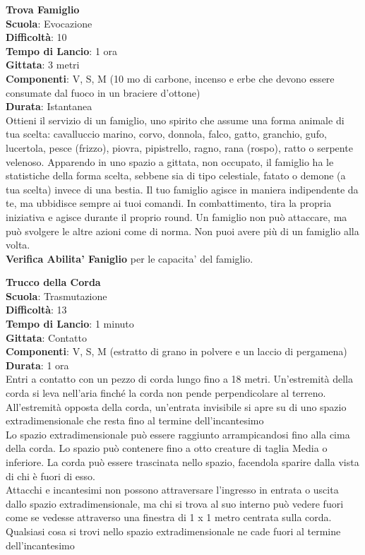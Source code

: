 \begin{multicols}{2}
\medskip\textbf{Trova Famiglio}\\
\textbf{Scuola}: Evocazione\\
\textbf{Difficoltà}:  10\\
\textbf{Tempo di Lancio}: 1 ora\\
\textbf{Gittata}: 3 metri\\
\textbf{Componenti}: V, S, M (10 mo di carbone, incenso e erbe che devono essere consumate dal fuoco in un braciere d'ottone)\\
\textbf{Durata}: Istantanea\\
Ottieni il servizio di un famiglio, uno spirito che assume una forma animale di tua scelta: cavalluccio marino, corvo, donnola, falco, gatto, granchio, gufo, lucertola, pesce (frizzo), piovra, pipistrello, ragno, rana (rospo), ratto o serpente velenoso. Apparendo in uno spazio a gittata, non occupato, il famiglio ha le statistiche della forma scelta, sebbene sia di tipo celestiale, fatato o demone (a tua scelta) invece di una bestia. Il tuo famiglio agisce in maniera indipendente da te, ma ubbidisce sempre ai tuoi comandi. In combattimento, tira la propria iniziativa e agisce durante il proprio round. Un famiglio non può attaccare, ma può svolgere le altre azioni come di norma. 
Non puoi avere più di un famiglio alla volta. \\
\textbf{Verifica Abilita' Faniglio} per le capacita' del famiglio.

\medskip\textbf{Trucco della Corda}\\
\textbf{Scuola}: Trasmutazione\\
\textbf{Difficoltà}:  13\\
\textbf{Tempo di Lancio}: 1 minuto\\
\textbf{Gittata}: Contatto\\
\textbf{Componenti}: V, S, M (estratto di grano in polvere e un laccio di pergamena)\\
\textbf{Durata}: 1 ora\\
Entri a contatto con un pezzo di corda lungo fino a 18 metri. Un'estremità della corda si leva nell'aria finché la corda non pende perpendicolare al terreno. All'estremità opposta della corda, un'entrata invisibile si apre su di uno spazio extradimensionale che resta fino al termine dell'incantesimo \\
Lo spazio extradimensionale può essere raggiunto arrampicandosi fino alla cima della corda. Lo spazio può contenere fino a otto creature di taglia Media o inferiore. La corda può essere trascinata nello spazio, facendola sparire dalla vista di chi è fuori di esso.\\
Attacchi e incantesimi non possono attraversare l'ingresso in entrata o uscita dallo spazio extradimensionale, ma chi si trova al suo interno può vedere fuori come se vedesse attraverso una finestra di 1 x 1 metro centrata sulla corda.\\
Qualsiasi cosa si trovi nello spazio extradimensionale ne cade fuori al termine dell'incantesimo


\end{multicols}
